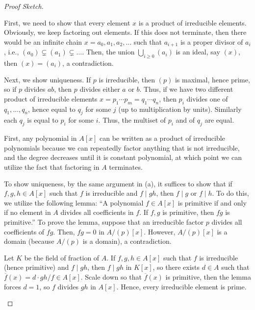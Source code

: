 \begin{proof}[Proof Sketch]
\begin{alphenum}
\item First, we need to show that every element $x$
is a product of irreducible elements.
Obviously, we keep factoring out elements.
If this does not terminate, then there would be an infinite
chain $x=a_0, a_1, a_2,\dots$ such that $a_{i+1}$ is a proper divisor of $a_i$, i.e., $(a_0)\subsetneq (a_1)\subsetneq \dots$.
Then, the union $\bigcup_{i\geq 0} (a_i)$ is an ideal,
say $(x)$, then $(x)=(a_i)$, a contradiction.

Next, we show uniqueness. If $p$ is irreducible,
then $(p)$ is maximal, hence prime, so if $p$ divides $ab$,
then $p$ divides either $a$ or $b$.
Thus, if we have two different product of irreducible elements
$x=p_1\cdots p_m = q_1\cdots q_n$, then $p_i$ divides
one of $q_1,\dots,q_n$, hence equal to $q_j$ for some $j$
(up to multiplication by units). Similarly each $q_j$ is equal
to $p_i$ for some $i$. Thus, the multiset of $p_i$ 
and of $q_j$ are equal.
\item 
First, any polynomial in $A[x]$ can be written as 
a product of irreducible polynomials because 
we can repeatedly factor anything that is not 
irreducible, and the degree decreases
until it is constant polynomial, at which point
we can utilize the fact that factoring in $A$ terminates.

To show uniqueness, by the same argument in (a),
it suffices to show that if $f,g,h\in A[x]$
such that $f$ is irreducible and $f\mid gh$,
then $f\mid g$ or $f\mid h$.
To do this, we utilize the following lemma:
``A polynomial $f\in A[x]$ is primitive if and only if
no element in $A$ divides all coefficients in $f$.
If $f,g$ is primitive, then $fg$ is primitive.''
To prove the lemma, suppose that an irreducible factor 
$p$ divides all coefficients of $fg$. Then, $fg=0$ in
$A/(p)[x]$. However, $A/(p)[x]$ is a domain (because $A/(p)$
is a domain), a contradiction.

Let $K$ be the field of fraction of $A$.
If $f,g,h\in A[x]$ such that $f$ is irreducible
(hence primitive) and $f\mid gh$, then 
$f\mid gh$ in $K[x]$, so there exists $d\in A$
such that $\overline f(x) = d\cdot gh/f \in A[x]$.
Scale down so that $\overline f(x)$ is primitive,
then the lemma forces $d=1$, so $f$ divides $gh$ in $A[x]$.
Hence, every irreducible element is prime.
\qedhere
\end{alphenum}
\end{proof}
